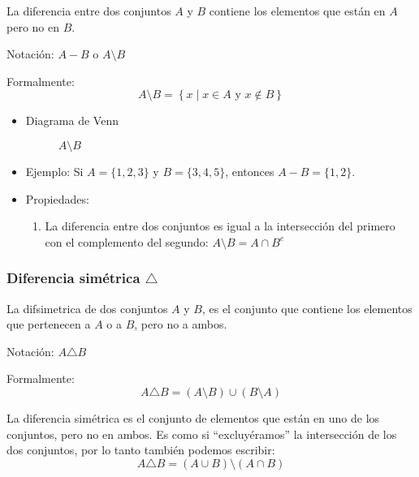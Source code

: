 \vspace{1em}
\begin{fmd-definition}
	La diferencia entre dos conjuntos \(A\) y \(B\) contiene los elementos que están en \(A\) pero no en \(B\).
	
	Notación: \(A - B\) o \( A \setminus B \)
	
	Formalmente:
	\[ A \setminus B = \left\{ x \mid x \in A \mbox{ y } x \not \in B \right\} \]
\end{fmd-definition}

\begin{itemize}
	\item Diagrama de Venn
	\begin{figure}[H]
		\centering
		\begin{venndiagram2sets}
			\fillOnlyA
		\end{venndiagram2sets}
		\caption*{$A \setminus B$}
	\end{figure}
	\item Ejemplo:
	Si \(A = \{1, 2, 3\}\) y \(B = \{3, 4, 5\}\), entonces \(A - B = \{1, 2\}\).
	\item Propiedades:
	\begin{enumerate}[label=\roman*)]
		\item La diferencia entre dos conjuntos es igual a la intersección del primero con el complemento del segundo: \( A \setminus B = A \cap B^c \)
	\end{enumerate}
\end{itemize}

\subsubsection{Diferencia simétrica $\triangle$}
\vspace{1em}
\begin{fmd-definition}
	La \gls{difsimetrica} de dos conjuntos \(A\) y \(B\), es el conjunto que contiene los elementos que pertenecen a \(A\) o a \(B\), pero no a ambos.
	
	Notación: \(A \triangle B\)
	
	Formalmente:
	$$A \triangle B = (A \setminus B) \cup (B \setminus A)$$
	
	La diferencia simétrica es el conjunto de elementos que están en uno de los conjuntos, pero no en ambos. Es como si ``excluyéramos'' la intersección de los dos conjuntos, por lo tanto también podemos escribir:
	\[ A \triangle B = \left( A \cup B \right) \setminus \left( A \cap B \right) \]
\end{fmd-definition}


